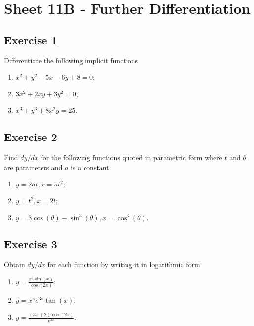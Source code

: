 \documentclass[
  11pt,
  oneside]{book}
\providecommand{\tightlist}{%
  \setlength{\itemsep}{0pt}\setlength{\parskip}{0pt}}
\newcommand{\slide}{}
\theoremstyle{definition}
\theoremstyle{definition}
\theoremstyle{definition}
\theoremstyle{definition}
\theoremstyle{remark}
\begin{document}
\section{Sheet 11B - Further Differentiation}\label{sheet-11b---further-differentiation}

\subsection*{Exercise 1}\label{exercise-1-5}

Differentiate the following implicit functions

\begin{enumerate}
\def\labelenumi{\roman{enumi}.}
\tightlist
\item
  \(x^2+y^2-5x-6y+8=0\);
\item
  \(3x^2+2xy+3y^2=0\);
\item
  \(x^3+y^3+8x^2y=25\).
\end{enumerate}

\slide

\subsection*{Exercise 2}\label{exercise-2-5}

Find \(dy/dx\) for the following functions quoted in parametric form where \(t\) and \(\theta\) are parameters and \(a\) is a constant.

\begin{enumerate}
\def\labelenumi{\roman{enumi}.}
\tightlist
\item
  \(y=2at, x = at^2\);
\item
  \(y=t^2, x = 2t\);
\item
  \(y=3\cos(\theta)-\sin^3(\theta), x = \cos^3(\theta)\).
\end{enumerate}

\slide

\subsection*{Exercise 3}\label{exercise-3-4}

Obtain \(dy/dx\) for each function by writing it in logarithmic form

\begin{enumerate}
\def\labelenumi{\roman{enumi}.}
\tightlist
\item
  \(y=\frac{x^2\sin(x)}{\cos(2x)}\);
\item
  \(y=x^5e^{3x}\tan(x)\);
\item
  \(y=\frac{(3x+2)\cos(2x)}{e^{2x}}\).
\end{enumerate}
\end{document}
